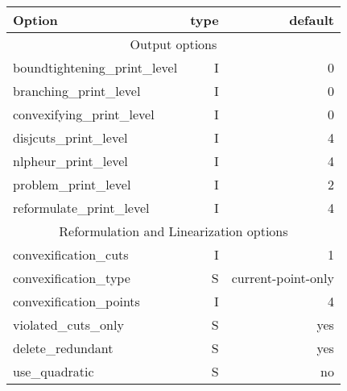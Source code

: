 \begin{center}
\begin{tabular}{|l|r|r|}\hline
Option & type &  default \\
\hline
\hline
\multicolumn{3}{|c|}{Output options}\\
\hline
boundtightening\_print\_level& I& 0\\
branching\_print\_level& I& 0\\
convexifying\_print\_level& I& 0\\
disjcuts\_print\_level& I& 4\\
nlpheur\_print\_level& I& 4\\
problem\_print\_level& I& 2\\
reformulate\_print\_level& I& 4\\\hline
\multicolumn{3}{|c|}{Reformulation and Linearization options}\\
\hline
convexification\_cuts& I& 1\\
convexification\_type& S& current-point-only\\
convexification\_points& I& 4\\
violated\_cuts\_only& S& yes\\
delete\_redundant& S& yes\\
use\_quadratic& S& no\\\hline
\end{tabular}


\end{center}
